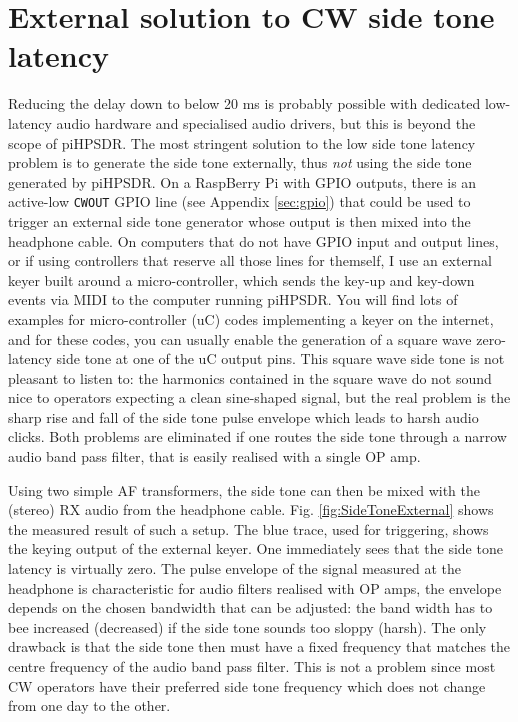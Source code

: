 \documentclass[12pt]{book}
\def\pH{pi\-HPSDR\xspace}
\begin{document}
\section{External solution to CW side tone latency}
Reducing the delay down to below 20 ms is probably possible with dedicated low-latency audio
hardware and specialised audio drivers, but this is beyond the scope of \pH.
The most stringent solution to the low side tone latency problem is
to generate the side tone externally, thus \textit{not} using the side tone generated by
\pH. On a RaspBerry Pi with GPIO outputs, there is an active-low \texttt{CWOUT} GPIO line
(see Appendix \ref{sec:gpio}) that could be used to trigger an external side tone generator whose output is
then mixed into the headphone cable.
On computers that do not have GPIO input and output lines,
or if using controllers that reserve all those lines for themself,
 I use an external keyer built around a micro-controller, which
sends the key-up and key-down events via MIDI to the computer running \pH. You will find
lots of examples for micro-controller (uC) codes implementing a keyer on the internet, and for
these codes, you can usually enable the generation of a square wave zero-latency side
tone at one of the uC output pins. This square wave side tone is not pleasant to listen to:
the harmonics
contained in the square wave do not sound nice to operators expecting a clean sine-shaped
signal, but the real problem is the sharp rise and fall of the side tone pulse envelope
which leads to harsh audio clicks. Both problems are eliminated
if one routes the side tone through a narrow audio band pass filter, that is easily realised with
a single OP amp.

Using two simple AF transformers, the side tone can then be mixed with the (stereo)
RX audio from the headphone cable.
Fig. \ref{fig:SideToneExternal} shows the measured result of such a setup.
The blue trace, used for triggering, shows the keying output of the external keyer.
One immediately
sees that the side tone latency is virtually zero. The pulse envelope of the signal measured
at the headphone is characteristic for audio filters realised with OP amps, the envelope
depends on the chosen bandwidth that can be adjusted: the band width has to bee increased
(decreased) if the side tone sounds too sloppy (harsh).
The only drawback is that the side tone then must have a fixed frequency that matches the
centre frequency of the audio band pass filter.
This is not a problem since most CW operators have their preferred side tone frequency
which does not change from one day to the other.
\end{document}

